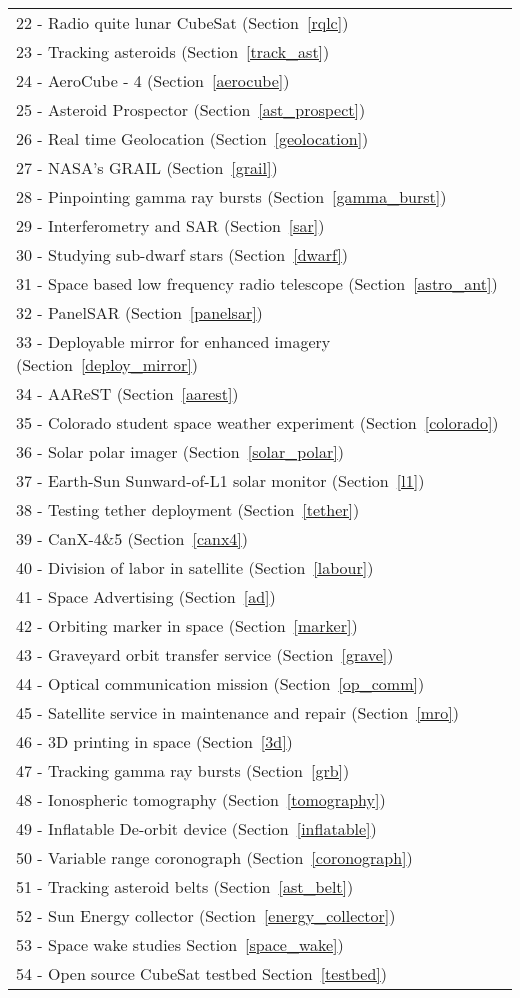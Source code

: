 \begin{tabular}{p{20cm}}
22 - Radio quite lunar CubeSat (Section~\ref{rqlc}) \\
23 - Tracking asteroids (Section~\ref{track_ast}) \\
24 - AeroCube - 4 (Section~\ref{aerocube}) \\
25 - Asteroid Prospector (Section~\ref{ast_prospect}) \\
26 - Real time Geolocation (Section~\ref{geolocation}) \\
27 - NASA's GRAIL (Section~\ref{grail}) \\
28 - Pinpointing gamma ray bursts (Section~\ref{gamma_burst}) \\
29 - Interferometry and SAR (Section~\ref{sar}) \\
30 - Studying sub-dwarf stars (Section~\ref{dwarf}) \\
31 - Space based low frequency radio telescope (Section~\ref{astro_ant}) \\
32 - PanelSAR (Section~\ref{panelsar}) \\
33 - Deployable mirror for enhanced imagery (Section~\ref{deploy_mirror}) \\
34 - AAReST (Section~\ref{aarest}) \\
35 - Colorado student space weather experiment (Section~\ref{colorado}) \\
36 - Solar polar imager (Section~\ref{solar_polar}) \\
37 - Earth-Sun Sunward-of-L1 solar monitor (Section~\ref{l1}) \\
38 - Testing tether deployment (Section~\ref{tether}) \\
39 - CanX-4\&5 (Section~\ref{canx4}) \\
40 - Division of labor in satellite (Section~\ref{labour})  \\
41 - Space Advertising (Section~\ref{ad}) \\
42 - Orbiting marker in space (Section~\ref{marker}) \\
43 - Graveyard orbit transfer service (Section~\ref{grave}) \\
44 - Optical communication mission (Section~\ref{op_comm}) \\
45 - Satellite service in maintenance and repair (Section~\ref{mro}) \\
46 - 3D printing in space (Section~\ref{3d}) \\
47 - Tracking gamma ray bursts (Section~\ref{grb}) \\
48 - Ionospheric tomography (Section~\ref{tomography}) \\
49 - Inflatable De-orbit device (Section~\ref{inflatable}) \\
50 - Variable range coronograph (Section~\ref{coronograph}) \\
51 - Tracking asteroid belts (Section~\ref{ast_belt}) \\
52 - Sun Energy collector (Section~\ref{energy_collector}) \\
53 - Space wake studies Section~\ref{space_wake}) \\
54 - Open source CubeSat testbed Section~\ref{testbed}) \\
\end{tabular}

\vspace{1cm}
